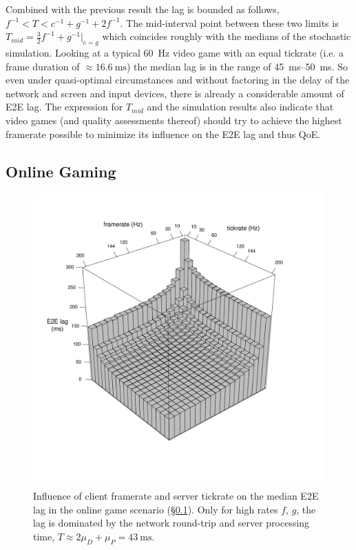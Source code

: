 Combined with the previous result the lag is bounded as follows, $f^{-1} < T < c^{-1}+g^{-1}+2f^{-1}$. The mid-interval point between these two limits is $T_{mid}=\frac{3}{2} f^{-1} + g^{-1}|_{c=g}$ which coincides roughly with the medians of the stochastic simulation. Looking at a typical \SI{60}{\hertz} video game with an equal tickrate (i.e. a frame duration of $\approx \SI{16.6}{\milli\second}$) the median lag is in the range of \SIrange{45}{50}{\milli\second}. So even under quasi-optimal circumstances and without factoring in the delay of the network and screen and input devices, there is already a considerable amount of \gls{E2E} lag. The expression for $T_{mid}$ and the simulation results also indicate that video games (and quality assessments thereof) should try to achieve the highest framerate possible to minimize its influence on the \gls{E2E} lag and thus \gls{QoE}.

\subsection{Online Gaming}
\label{subsec:online-gaming}


\begin{figure}[!t]
	\centering
	\vspace{-6mm}
	\includegraphics[width=1.0\columnwidth]{../../../simulation/visualization/e2e-lag-3dbars.pdf}
	\vspace{-15mm}
	\caption{Influence of client framerate and server tickrate on the median \gls{E2E} lag in the online game scenario (§\ref{subsec:online-gaming}). Only for high rates $f$, $g$, the lag is dominated by the network round-trip and server processing time, $T\approx2\mu_D+\mu_P=\SI{43}{\milli\second}$.}
\label{fig:3dbars-framerate-tickrate-lag}
\end{figure}

